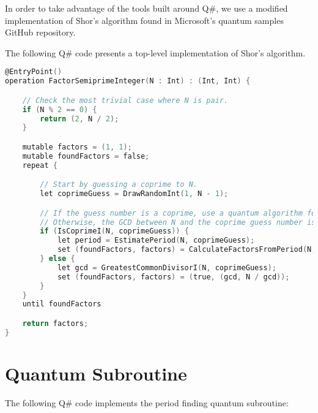 In order to take advantage of the tools built around Q\#, we use a modified implementation of Shor's algorithm found in Microsoft's quantum samples GitHub repository.



The following Q\# code presents a top-level implementation of Shor's algorithm.

\begin{lstlisting}[language=C]
@EntryPoint()
operation FactorSemiprimeInteger(N : Int) : (Int, Int) {

    // Check the most trivial case where N is pair.
    if (N % 2 == 0) {
        return (2, N / 2);
    }

    mutable factors = (1, 1);
    mutable foundFactors = false;
    repeat {

        // Start by guessing a coprime to N.
        let coprimeGuess = DrawRandomInt(1, N - 1);

        // If the guess number is a coprime, use a quantum algorithm for period finding.
        // Otherwise, the GCD between N and the coprime guess number is one of the factors.
        if (IsCoprimeI(N, coprimeGuess)) {
            let period = EstimatePeriod(N, coprimeGuess);
            set (foundFactors, factors) = CalculateFactorsFromPeriod(N, coprimeGuess, period);
        } else {
            let gcd = GreatestCommonDivisorI(N, coprimeGuess);
            set (foundFactors, factors) = (true, (gcd, N / gcd));
        }
    }
    until foundFactors

    return factors;
}
\end{lstlisting}

\section{Quantum Subroutine}


The following Q\# code implements the period finding quantum subroutine:

